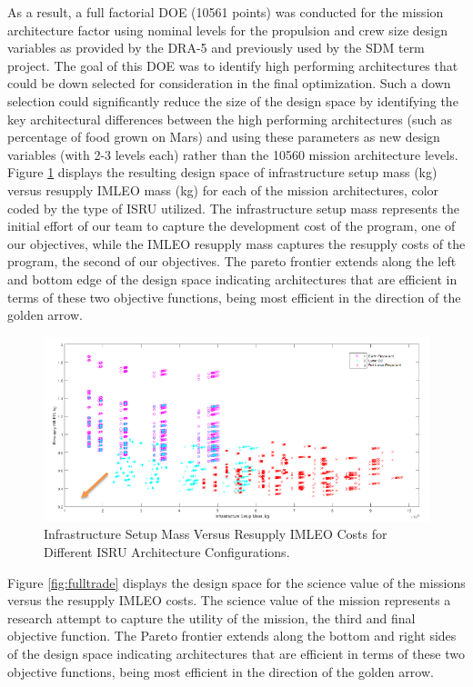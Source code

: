 \documentclass[]{aiaa-pretty}
\begin{document}
As a result, a full factorial DOE (10561 points) was conducted for the mission architecture factor using nominal levels for the propulsion and crew size design variables as provided by the DRA-5 and previously used by the SDM term project. The goal of this DOE was to identify high performing architectures that could be down selected for consideration in the final optimization. Such a down selection could significantly reduce the size of the design space by identifying the key architectural differences between the high performing architectures (such as percentage of food grown on Mars) and using these parameters as new design variables (with 2-3 levels each) rather than the 10560 mission architecture levels. Figure \ref{fig:infratrade} displays the resulting design space of infrastructure setup mass (kg) versus resupply IMLEO mass (kg) for each of the mission architectures, color coded by the type of ISRU utilized. The infrastructure setup mass represents the initial effort of our team to capture the development cost of the program, one of our objectives, while the IMLEO resupply mass captures the resupply costs of the program, the second of our objectives. The pareto frontier extends along the left and bottom edge of the design space indicating architectures that are efficient in terms of these two objective functions, being most efficient in the direction of the golden arrow.

\begin{figure}[h!]
	\centering
	\includegraphics[width=\textwidth]{InfraTrade}  %
	\caption{Infrastructure Setup Mass Versus Resupply IMLEO Costs for Different ISRU Architecture Configurations.}
	\label{fig:infratrade}
\end{figure}

Figure \ref{fig:fulltrade} displays the design space for the science value of the missions versus the resupply IMLEO costs. The science value of the mission represents a research attempt to capture the utility of the mission, the third and final objective function. The Pareto frontier extends along the bottom and right sides of the design space indicating architectures that are efficient in terms of these two objective functions, being most efficient in the direction of the golden arrow.
\end{document}
